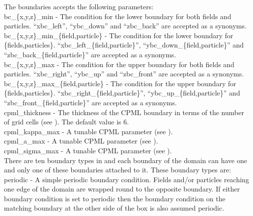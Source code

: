The {\emphtext boundaries} accepts the following parameters:\\

{\emphtext bc\_\{x,y,z\}\_min} - The condition for the lower boundary for both
fields and particles. ``xbc\_left'', ``ybc\_down'' and ``zbc\_back'' are
accepted as a synonyms.\\

{\emphtext bc\_\{x,y,z\}\_min\_\{field,particle\}} - The condition for the lower
boundary for \{fields,particles\}. ``xbc\_left\_\{field,particle\}'',
``ybc\_down\_\{field,particle\}'' and ``zbc\_back\_\{field,particle\}'' are
accepted as a synonyms.\\

{\emphtext bc\_\{x,y,z\}\_max} - The condition for the upper boundary for both
fields and particles. ``xbc\_right'', ``ybc\_up'' and ``zbc\_front'' are
accepted as a synonyms.\\

{\emphtext bc\_\{x,y,z\}\_max\_\{field,particle\}} - The condition for the upper
boundary for \{fields,particles\}. ``xbc\_right\_\{field,particle\}'',
``ybc\_up\_\{field,particle\}'' and ``zbc\_front\_\{field,particle\}'' are
accepted as a synonyms.\\

{\emphtext cpml\_thickness} - The thickness of the CPML boundary in terms
  of the number of grid cells (see ). The default value is 6.\\

{\emphtext cpml\_kappa\_max} - A tunable CPML parameter (see ).\\

{\emphtext cpml\_a\_max} - A tunable CPML parameter (see ).\\

{\emphtext cpml\_sigma\_max} - A tunable CPML parameter (see ).\\

There are ten boundary types in {\EPOCH} and each boundary of the domain can
have one and only one of these boundaries attached to it. These boundary types
are:\\

{\emphtext periodic} - A simple periodic boundary condition. Fields and/or
particles reaching one edge of the domain are wrapped round to the opposite
boundary. If either boundary condition is set to periodic
then the boundary condition on the matching boundary at the other side of
the box is also assumed periodic.\\

